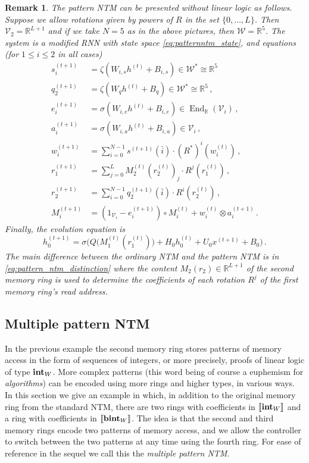 \documentclass[english,letter paper,12pt,leqno]{article}
\theoremstyle{example}
\newtheorem{remark}[theorem]{Remark}
\numberwithin{equation}{section}
\def\be{\begin{equation}}
\def\ee{\end{equation}}
\DeclareMathOperator{\End}{End}
\begin{document}
\begin{remark}\label{remark:alt_presentation} The pattern NTM can be presented without linear logic as follows. Suppose we allow rotations given by powers of $R$ in the set $\{0,\ldots,L\}$. Then $\mathscr{V}_2 = \mathbb{R}^{L+1}$ and if we take $N = 5$ as in the above pictures, then $\mathscr{W} = \mathbb{R}^5$. The system is a modified RNN with state space \eqref{eq:patternntm_state}, and equations (for $1 \le i \le 2$ in all cases)
\begin{align}
s_i^{(t+1)} &= \zeta( W_{i,s} h^{(t)} + B_{i,s} ) \in \mathscr{W}^* \cong \mathbb{R}^5\,\\
q_2^{(t+1)} &= \zeta( W_q h^{(t)} + B_q ) \in \mathscr{W}^* \cong \mathbb{R}^5\,,\\
e_i^{(t+1)} &= \sigma( W_{i,e} h^{(t)} + B_{i,e} ) \in \End_{\mathbb{R}}(\mathscr{V}_i)\,,\\
a_i^{(t+1)} &= \sigma( W_{i,a} h^{(t)} + B_{i,a} ) \in \mathscr{V}_i\,,\\
w_i^{(t+1)} &= \sum_{i=0}^{N-1} s^{(t+1)}(\bar{i}) \cdot (R^*)^i( w^{(t)}_i )\,,\\
r_1^{(t+1)} &= \sum_{j=0}^L M_2^{(t)}(r_2^{(t)})_j \cdot R^j(r_1^{(t)})\,,\label{eq:pattern_ntm_distinction}\\
r_2^{(t+1)} &= \sum_{i=0}^{N-1} q_2^{(t+1)}(\bar{i}) \cdot R^i( r_2^{(t)} )\,,\\
M_i^{(t+1)} &= (1_{\mathscr{V}_i} - e_i^{(t+1)}) \circ M_i^{(t)} + w_i^{(t)} \otimes a_i^{(t+1)}\,.
\end{align}
Finally, the evolution equation is
\be
h_0^{(t+1)} = \sigma\Big( Q\big( M_1^{(t)}(r_1^{(t)}) \big) + H_0 h_0^{(t)} + U_0 x^{(t+1)} + B_0 \Big)\,.
\ee
The main difference between the ordinary NTM and the pattern NTM is in \eqref{eq:pattern_ntm_distinction} where the content $M_2(r_2) \in \mathbb{R}^{L+1}$ of the second memory ring is used to determine the coefficients of each rotation $R^j$ of the first memory ring's read address.
\end{remark}

\subsection{Multiple pattern NTM}\label{example:ntm_super}

In the previous example the second memory ring stores patterns of memory access in the form of sequences of integers, or more precisely, proofs of linear logic of type $\textbf{int}_W$. More complex patterns (this word being of course a euphemism for \emph{algorithms}) can be encoded using more rings and higher types, in various ways. In this section we give an example in which, in addition to the original memory ring from the standard NTM, there are two rings with coefficients in $\llbracket \textbf{int}_W \rrbracket$ and a ring with coefficients in $\llbracket \textbf{bint}_W \rrbracket$. The idea is that the second and third memory rings encode two patterns of memory access, and we allow the controller to switch between the two patterns at any time using the fourth ring. For ease of reference in the sequel we call this the \emph{multiple pattern NTM}.
\end{document}
